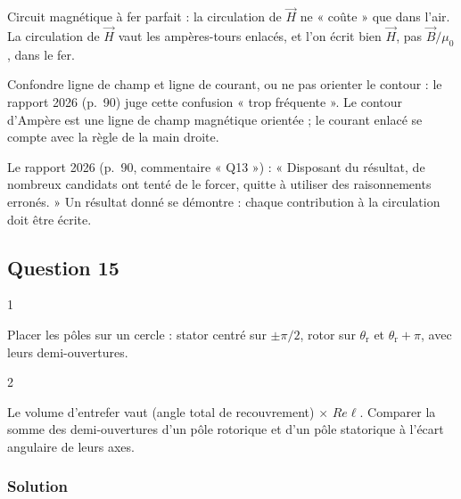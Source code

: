 \documentclass[11pt,a4paper]{article}
\begin{document}
\begin{methode}

Circuit magnétique à fer parfait : la circulation de \(\vec H\) ne « coûte » que dans l'air. La circulation de \(\vec H\) vaut les ampères-tours enlacés, et l'on écrit bien \(\vec H\), pas \(\vec B/\mu_0\), dans le fer.

\end{methode}

\begin{piege}

Confondre ligne de champ et ligne de courant, ou ne pas orienter le contour : le rapport 2026 (p.~90) juge cette confusion « trop fréquente ». Le contour d'Ampère est une ligne de champ magnétique orientée ; le courant enlacé se compte avec la règle de la main droite.

\end{piege}

\begin{jury}

Le rapport 2026 (p.~90, commentaire « Q13 ») : « Disposant du résultat, de nombreux candidats ont tenté de le forcer, quitte à utiliser des raisonnements erronés. » Un résultat donné se démontre : chaque contribution à la circulation doit être écrite.

\end{jury}

\hypertarget{question-15}{%
\subsection{Question 15}\label{question-15}}

\begin{indication}{1}

Placer les pôles sur un cercle : stator centré sur \(\pm\pi/2\), rotor sur \(\theta_{\mathrm r}\) et \(\theta_{\mathrm r}+\pi\), avec leurs demi-ouvertures.

\end{indication}

\begin{indication}{2}

Le volume d'entrefer vaut (angle total de recouvrement) × \(Re\ell\). Comparer la somme des demi-ouvertures d'un pôle rotorique et d'un pôle statorique à l'écart angulaire de leurs axes.

\end{indication}

\hypertarget{solution-14}{%
\subsubsection{Solution}\label{solution-14}}
\end{document}
